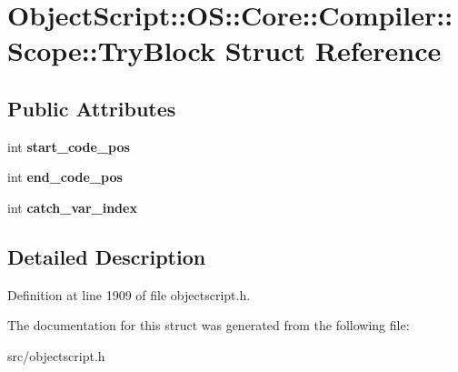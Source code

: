\hypertarget{struct_object_script_1_1_o_s_1_1_core_1_1_compiler_1_1_scope_1_1_try_block}{}\section{Object\+Script\+:\+:OS\+:\+:Core\+:\+:Compiler\+:\+:Scope\+:\+:Try\+Block Struct Reference}
\label{struct_object_script_1_1_o_s_1_1_core_1_1_compiler_1_1_scope_1_1_try_block}
\subsection*{Public Attributes}
\begin{DoxyCompactItemize}
\item 
int {\bfseries start\+\_\+code\+\_\+pos}\hypertarget{struct_object_script_1_1_o_s_1_1_core_1_1_compiler_1_1_scope_1_1_try_block_accd3a00596e7a34bee96adf0d6e5449b}{}\label{struct_object_script_1_1_o_s_1_1_core_1_1_compiler_1_1_scope_1_1_try_block_accd3a00596e7a34bee96adf0d6e5449b}

\item 
int {\bfseries end\+\_\+code\+\_\+pos}\hypertarget{struct_object_script_1_1_o_s_1_1_core_1_1_compiler_1_1_scope_1_1_try_block_ab9a04a243d43bf2cfe59ae0bc87c1a8f}{}\label{struct_object_script_1_1_o_s_1_1_core_1_1_compiler_1_1_scope_1_1_try_block_ab9a04a243d43bf2cfe59ae0bc87c1a8f}

\item 
int {\bfseries catch\+\_\+var\+\_\+index}\hypertarget{struct_object_script_1_1_o_s_1_1_core_1_1_compiler_1_1_scope_1_1_try_block_a4d31a3f8a85ba56921339833e3419a24}{}\label{struct_object_script_1_1_o_s_1_1_core_1_1_compiler_1_1_scope_1_1_try_block_a4d31a3f8a85ba56921339833e3419a24}

\end{DoxyCompactItemize}


\subsection{Detailed Description}


Definition at line 1909 of file objectscript.\+h.



The documentation for this struct was generated from the following file\+:\begin{DoxyCompactItemize}
\item 
src/objectscript.\+h\end{DoxyCompactItemize}
